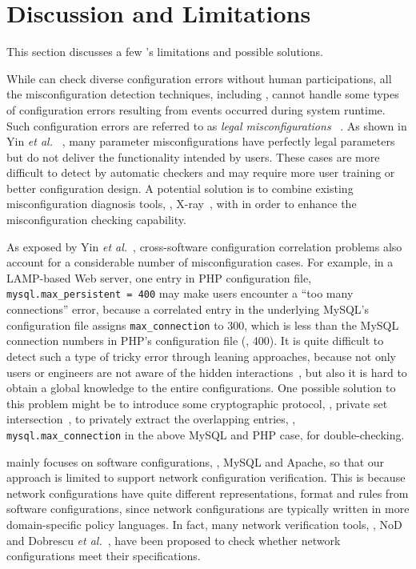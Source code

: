 
\section{Discussion and Limitations}

This section discusses a few \app's limitations
and possible solutions.

While \app can check diverse configuration errors without
human participations, all the misconfiguration detection techniques,
including \app, cannot handle some types of configuration errors
resulting from events occurred during system runtime.
Such configuration errors are referred to as {\em legal misconfigurations}%
~\cite{yin11anempirical}. As shown in Yin {\em et al.}%
~\cite{yin11anempirical}, many parameter misconfigurations have 
perfectly legal parameters but do not deliver the functionality intended
by users. These cases are more difficult to detect by
automatic checkers and may require more user training or
better configuration design.
A potential solution is to combine existing misconfiguration diagnosis
tools, \eg, X-ray~\cite{attariyan12x-ray}, 
with \app in order to enhance the 
misconfiguration checking capability.

As exposed by Yin {\em et al.}~\cite{yin11anempirical},
cross-software configuration correlation problems also account
for a considerable number of misconfiguration cases.
For example, in a LAMP-based Web server, one entry in 
PHP configuration file, {\tt mysql.max\_persistent = 400}
may make users encounter a ``too many connections'' error,
because a correlated entry in the underlying MySQL's configuration
file assigns {\tt max\_connection} to 300, which is less
than the MySQL connection numbers in PHP's configuration file (\ie, 400).
It is quite difficult to detect such a type of tricky error
through leaning approaches, because not only users or engineers 
are not aware of the hidden interactions~\cite{xu15systems},
but also it is hard to obtain a global knowledge to the entire
configurations.
One possible solution to this problem might be to introduce
some cryptographic protocol, \eg, private set
intersection~\cite{kissner05privacy}, to privately extract the
overlapping entries, \eg, {\tt mysql.max\_connection} in the 
above MySQL and PHP case, for double-checking.

\app mainly focuses on software configurations, \eg, MySQL and Apache,
so that our approach is limited to support network configuration
verification. This is because network configurations have quite
different representations, format and rules from software configurations,
since network configurations are typically written in 
more domain-specific policy languages.
In fact, many network verification tools, 
\eg, NoD~\cite{lopes15checking} and 
Dobrescu {\em et al.}~\cite{dobrescu14software},
have been proposed to check whether network configurations
meet their specifications.

 
